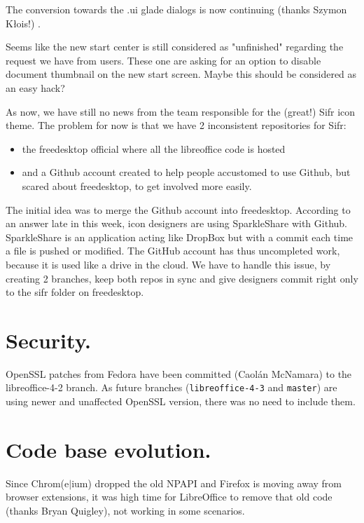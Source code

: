 \documentclass{article}
\begin{document}
The conversion towards the .ui glade dialogs is now continuing (thanks Szymon
Kłois!) \cite{gladeUi1,gladeUi2,gladeUi3}.

Seems like the new start center is still considered as "unfinished" regarding
the request we have from users. These one are asking for an option to disable
document thumbnail on the new start
screen\cite{startCenterHidePreview1}\cite{startCenterHidePreview2}. Maybe this
should be considered as an easy hack?

As now, we have still no news from the team responsible for the (great!) Sifr
icon theme. The problem for now is that we have 2 inconsistent repositories for
Sifr: \begin{itemize} \item the freedesktop official where all the libreoffice
            code is hosted \item and a Github account created to help people
                accustomed to use Github, but scared about freedesktop, to get
                involved more easily.  \end{itemize}

The initial idea was to merge the Github account into freedesktop. According to
an answer late in this week\cite{sifrGithub1}, icon designers are using
SparkleShare with Github. SparkleShare is an application acting like DropBox
but with a commit each time a file is pushed or modified. The GitHub account
has thus uncompleted work, because it is used like a drive in the cloud. We
have to handle this issue, by creating 2 branches, keep both repos in sync and
give designers commit right only to the sifr folder on freedesktop.



\section{Security.}

OpenSSL patches from Fedora have been committed\cite{opensslPatches} (Caolán
McNamara) to the libreoffice-4-2 branch. As future branches
(\lstinline{libreoffice-4-3} and \lstinline{master}) are using newer and
unaffected OpenSSL version, there was no need to include them.

\section{Code base evolution.}

Since Chrom(e$\vert$ium) dropped the old NPAPI and Firefox is moving away from
browser extensions\cite{npapiMozilla}, it was high time for LibreOffice to
remove that old code\cite{removeNpapiPatch} (thanks Bryan Quigley), not working
in some scenarios\cite{npapiLibONotWorking}.
\end{document}
